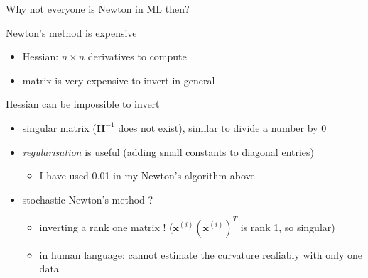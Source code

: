 \documentclass[ignorenonframetext,aspectratio=169]{beamer}
\providecommand{\tightlist}{%
  \setlength{\itemsep}{0pt}\setlength{\parskip}{0pt}}
\newcommand{\vv}[1]{\boldsymbol{#1}}
\newcommand{\dd}[1]{\ensuremath{ #1^{(i)}}}
\begin{document}
\begin{frame}{Why not everyone is Newton in ML then?}
\protect\hypertarget{why-not-everyone-is-newton-in-ml-then-1}{}

Newton's method is expensive

\begin{itemize}
\tightlist
\item
  Hessian: \(n\times n\) derivatives to compute
\item
  matrix is very expensive to invert in general
\end{itemize}

\bigskip

Hessian can be impossible to invert

\begin{itemize}
\tightlist
\item
  singular matrix (\(\vv{H}^{-1}\) does not exist), similar to divide a
  number by \(0\)
\item
  \emph{regularisation} is useful (adding small constants to diagonal
  entries)

  \begin{itemize}
  \tightlist
  \item
    I have used 0.01 in my Newton's algorithm above
  \end{itemize}
\item
  stochastic Newton's method ?

  \begin{itemize}
  \tightlist
  \item
    inverting a rank one matrix ! (\(\dd{\vv{x}}(\dd{\vv{x}})^T\) is
    rank 1, so singular)
  \item
    in human language: cannot estimate the curvature realiably with only
    one data
  \end{itemize}
\end{itemize}

\end{frame}
\end{document}
